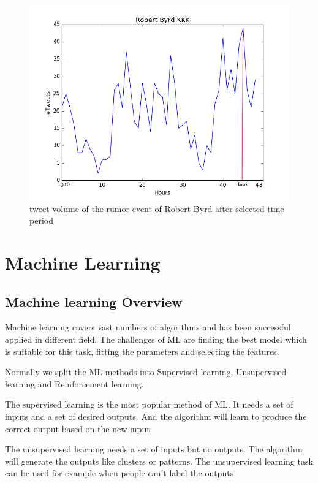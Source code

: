 \begin{figure}[!h]
\centering
\includegraphics[width=0.7\columnwidth]{images/Robert_Byrd_KKK.png}
\caption{tweet volume of the rumor event of Robert Byrd after selected time period}
\label{fig:KKK_part}
\end{figure}



\section{Machine Learning } %
\label{sec:Maschine_learning}
\subsection{Machine learning Overview} %

 Machine learning covers vast numbers of algorithms and has been successful applied in different field. The challenges of ML are finding the best model which is suitable for this task, fitting the parameters and selecting the features. 
 
Normally we split the ML methods into Supervised learning, Unsupervised learning and Reinforcement learning\cite{russell2003artificial}. 

The supervised learning is the most popular method of ML. It needs a set of inputs and a set of desired outputs. And the algorithm will learn to produce the correct output based on the new input. 

The unsupervised learning needs a set of inputs but no outputs. The algorithm will generate the outputs like clusters or patterns. The unsupervised learning task can be used for example when people can't label the outputs. 
